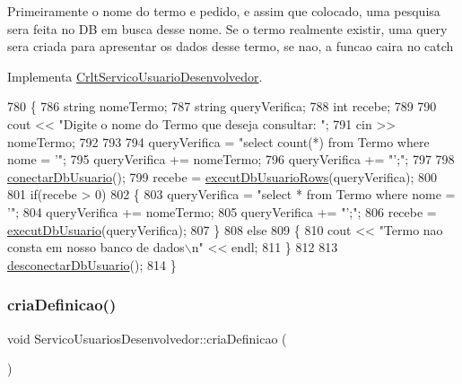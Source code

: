 Primeiramente o nome do termo e pedido, e assim que colocado, uma pesquisa sera feita no DB em busca desse nome. Se o termo realmente existir, uma query sera criada para apresentar os dados desse termo, se nao, a funcao caira no catch

Implementa \mbox{\hyperlink{class_crlt_servico_usuario_desenvolvedor_a328f8ac2978c844ed4331d61ebfce32a}{Crlt\+Servico\+Usuario\+Desenvolvedor}}.


\begin{DoxyCode}
780 \{
786   \textcolor{keywordtype}{string} nomeTermo;
787   \textcolor{keywordtype}{string} queryVerifica;
788   \textcolor{keywordtype}{int} recebe;
789 
790   cout << \textcolor{stringliteral}{"Digite o nome do Termo que deseja consultar: "};
791   cin >> nomeTermo;
792 
793 
794   queryVerifica = \textcolor{stringliteral}{"select count(*) from Termo where nome = '"};
795   queryVerifica += nomeTermo;
796   queryVerifica += \textcolor{stringliteral}{"';"};
797 
798   \mbox{\hyperlink{comando_sql_8cpp_a4f89ddcbc4cf8f2587d89f72f8c7900d}{conectarDbUsuario}}();
799   recebe = \mbox{\hyperlink{comando_sql_8cpp_af54952694f2fa7d76f969fb74b853cb9}{executDbUsuarioRows}}(queryVerifica);
800 
801   \textcolor{keywordflow}{if}(recebe > 0)
802       \{
803         queryVerifica = \textcolor{stringliteral}{"select * from Termo where nome = '"};
804         queryVerifica += nomeTermo;
805         queryVerifica += \textcolor{stringliteral}{"';"};
806         recebe = \mbox{\hyperlink{comando_sql_8cpp_a748197580e7f9acdbf48c78de1f7924b}{executDbUsuario}}(queryVerifica);
807       \}
808   \textcolor{keywordflow}{else}
809       \{
810         cout << \textcolor{stringliteral}{"Termo nao consta em nosso banco de dados\(\backslash\)n"} << endl;
811       \}
812 
813       \mbox{\hyperlink{comando_sql_8cpp_a969be9911913568e30d4ae8963338bc3}{desconectarDbUsuario}}();
814 \}
\end{DoxyCode}
\mbox{\label{class_servico_usuarios_desenvolvedor_a851c2a4b054df2a14f66c451f4656d52}} 
\subsubsection{\texorpdfstring{cria\+Definicao()}{criaDefinicao()}}
{\footnotesize\ttfamily void Servico\+Usuarios\+Desenvolvedor\+::cria\+Definicao (\begin{DoxyParamCaption}{ }\end{DoxyParamCaption})\hspace{0.3cm}{\ttfamily [virtual]}}

